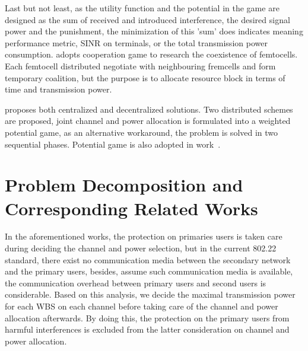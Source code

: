 Last but not least, as the utility function and the potential in the game are designed as the sum of received and introduced interference, the desired signal power and the punishment, the minimization of this 'sum' does indicates meaning  performance metric, \ie SINR on terminals, or the total transmission power consumption.
\cite{powerChannelAllocation_2015_shapley} adopts cooperation game to research the coexistence of femtocells.
Each femtocell distributed negotiate with neighbouring fremcells and form temporary coalition, but the purpose is to allocate resource block in terms of time and transmission power.



\cite{joint_power_channel_linkpair_08ICT} proposes both centralized and decentralized solutions.
Two distributed schemes are proposed, joint channel and power allocation is formulated into a weighted potential game, as an alternative workaround, the problem is solved in two sequential phases.
Potential game is also adopted in work~\cite{tvws_paper_networking2015}.
\section{Problem Decomposition and Corresponding Related Works}
In the aforementioned works, the protection on primaries users is taken care during deciding the channel and power selection, but in the current 802.22 standard, there exist no communication media between the secondary network and the primary users, besides, assume such communication media is available, the communication overhead between primary users and second users is considerable.
Based on this analysis, we decide the maximal transmission power for each WBS on each channel before taking care of the channel and power allocation afterwards.
By doing this, the protection on the primary users from harmful interferences is excluded from the latter consideration on channel and power allocation.


